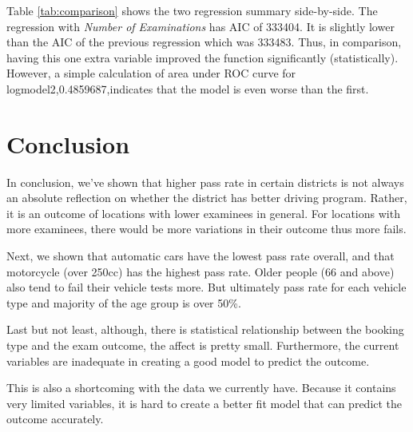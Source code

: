 \documentclass[11pt,a4paper,]{article}
\begin{document}
Table \ref{tab:comparison} shows the two regression summary side-by-side. The regression with \emph{Number of Examinations} has AIC of 333404. It is slightly lower than the AIC of the previous regression which was 333483. Thus, in comparison, having this one extra variable improved the function significantly (statistically). However, a simple calculation of area under ROC curve for logmodel2,0.4859687,indicates that the model is even worse than the first.

\section*{Conclusion}

In conclusion, we've shown that higher pass rate in certain districts is not always an absolute reflection on whether the district has better driving program. Rather, it is an outcome of locations with lower examinees in general. For locations with more examinees, there would be more variations in their outcome thus more fails.

Next, we shown that automatic cars have the lowest pass rate overall, and that motorcycle (over 250cc) has the highest pass rate. Older people (66 and above) also tend to fail their vehicle tests more. But ultimately pass rate for each vehicle type and majority of the age group is over 50\%.

Last but not least, although, there is statistical relationship between the booking type and the exam outcome, the affect is pretty small. Furthermore, the current variables are inadequate in creating a good model to predict the outcome.

This is also a shortcoming with the data we currently have. Because it contains very limited variables, it is hard to create a better fit model that can predict the outcome accurately.

\printbibliography
\end{document}
